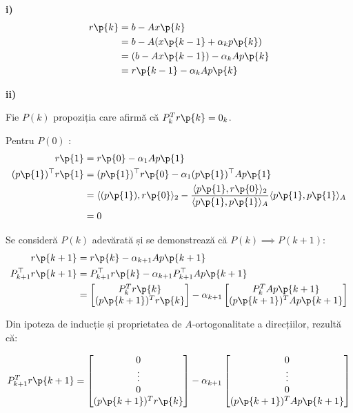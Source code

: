 \begin{demonstratie}

    \bigskip

    \noindent \textbf{i)}
    \begin{align*}
        r\p{k} &= b - A x\p{k} \\
        &= b - A (x\p{k - 1} + \alpha_k p\p{k}) \\
        &= (b - A x\p{k - 1}) - \alpha_k A p\p{k} \\
        &= r\p{k - 1} - \alpha_k A p\p{k}
    \end{align*}

    \noindent \textbf{ii)}

    Fie $ P(k) $ propoziția care afirmă că $ P_k^T r\p{k} = 0_k $.

    \medskip

    Pentru $ P(0) $ :
    \begin{align*}
        r\p{1} &= r\p{0} - \alpha_1 A p\p{1} \\
        (p\p{1})^{\top} r\p{1} &= (p\p{1})^{\top} r\p{0} - \alpha_1 (p\p{1})^{\top} A p\p{1} \\
        &= \langle (p\p{1}), r\p{0} \rangle_2 - \frac{\langle p\p{1}, r\p{0}\rangle_2}{\langle p\p{1}, p\p{1} \rangle_A} \langle p\p{1}, p\p{1} \rangle_A \\
        &= 0
    \end{align*}

    Se consideră $ P(k) $ adevărată și se demonstrează că $ P(k) \implies P(k + 1) $:
    \begin{align*}
        r\p{k + 1} &= r\p{k} - \alpha_{k + 1} A p\p{k + 1} \\
        P_{k+1}^{\top} r\p{k + 1} &= P_{k+1}^{\top} r\p{k} - \alpha_{k + 1} P_{k+1}^{\top} A p\p{k + 1} \\
        &= \begin{bmatrix} P_k^T r\p{k} \\ (p\p{k+1})^T r\p{k} \end{bmatrix} - \alpha_{k + 1} \begin{bmatrix} P_k^T A p\p{k+1} \\ (p\p{k+1})^T A p\p{k+1} \end{bmatrix}\\
    \end{align*}

    Din ipoteza de inducție și proprietatea de $A$-ortogonalitate a direcțiilor, rezultă că:

    \begin{equation*}
        P_{k+1}^T r\p{k+1} = \begin{bmatrix} 0 \\ \vdots \\ 0 \\ (p\p{k+1})^T r\p{k} \end{bmatrix} - \alpha_{k+1} \begin{bmatrix} 0 \\ \vdots \\ 0 \\ (p\p{k+1})^T A p\p{k+1} \end{bmatrix}
    \end{equation*}


\end{demonstratie}
